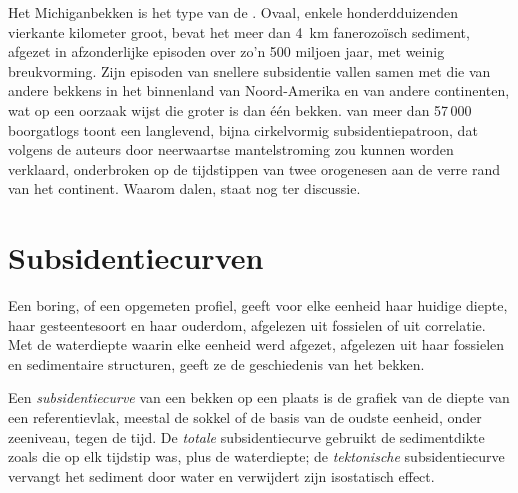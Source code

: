Het Michiganbekken is het type van de . Ovaal, enkele honderdduizenden
vierkante kilometer groot, bevat het meer dan \qty{4}{km} fanerozoïsch sediment, afgezet
in afzonderlijke episoden over zo'n 500 miljoen jaar, met weinig breukvorming. Zijn episoden van snellere
subsidentie vallen samen met die van andere bekkens in het binnenland van Noord-Amerika en van andere
continenten, wat op een oorzaak wijst die groter is dan één bekken.  van meer dan 57\,000
boorgatlogs toont een langlevend, bijna cirkelvormig subsidentiepatroon, dat volgens de auteurs
door neerwaartse mantelstroming zou kunnen worden verklaard, onderbroken op de tijdstippen van twee orogenesen aan de verre
rand van het continent. Waarom  dalen, staat nog ter discussie.

\section{Subsidentiecurven}\label{sec:b2:basins-compared:curves}

Een boring, of een opgemeten profiel, geeft voor elke eenheid haar huidige diepte, haar gesteentesoort en haar ouderdom,
afgelezen uit fossielen of uit correlatie. Met de waterdiepte waarin elke eenheid werd
afgezet, afgelezen uit haar fossielen en sedimentaire structuren, geeft ze de geschiedenis van het bekken.

\begin{definition}[Subsidentiecurve]\label{def:b2:basins-compared:curve}
Een \emph{subsidentiecurve} van een bekken op een plaats is de grafiek van de diepte
van een referentievlak, meestal de sokkel of de basis van de oudste eenheid, onder zeeniveau,
tegen de tijd. De \emph{totale} subsidentiecurve gebruikt de sedimentdikte zoals die op elk
tijdstip was, plus de waterdiepte; de \emph{tektonische} subsidentiecurve vervangt het sediment door water
en verwijdert zijn isostatisch effect.
\end{definition}


